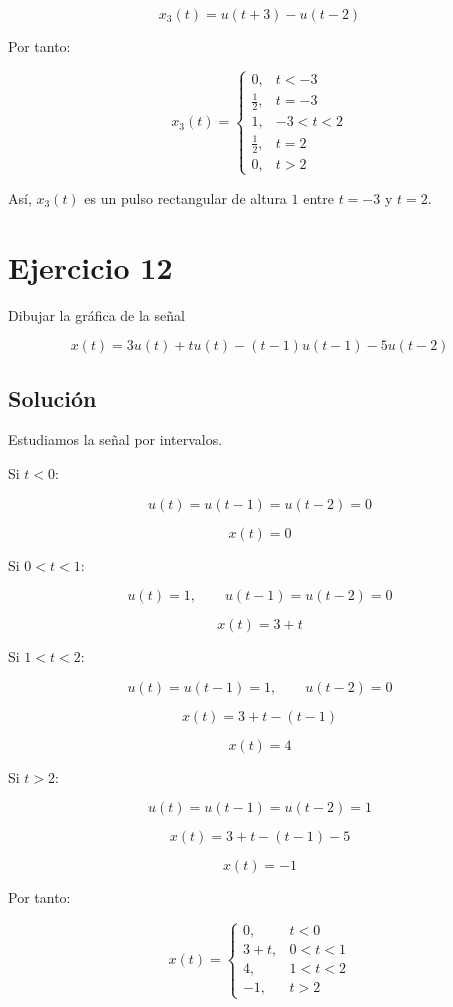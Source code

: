 \documentclass[fleqn]{article}
\begin{document}
	\[
	x_3(t)
	=
	u(t+3)-u(t-2)
	\]

	Por tanto:

	\[
	\boxed{
	x_3(t)=
	\begin{cases}
	0, & t<-3 \\[1mm]
	\frac{1}{2}, & t=-3 \\[1mm]
	1, & -3<t<2 \\[1mm]
	\frac{1}{2}, & t=2 \\[1mm]
	0, & t>2
	\end{cases}
	}
	\]

	Así, $x_3(t)$ es un pulso rectangular de altura $1$ entre $t=-3$ y $t=2$.

\section{Ejercicio 12}
	Dibujar la gráfica de la señal

	\[
	x(t)=3u(t)+tu(t)-(t-1)u(t-1)-5u(t-2)
	\]

	\subsection{Solución}

	Estudiamos la señal por intervalos.

	Si $t<0$:

	\[
	u(t)=u(t-1)=u(t-2)=0
	\]

	\[
	x(t)=0
	\]

	Si $0<t<1$:

	\[
	u(t)=1,
	\qquad
	u(t-1)=u(t-2)=0
	\]

	\[
	x(t)=3+t
	\]

	Si $1<t<2$:

	\[
	u(t)=u(t-1)=1,
	\qquad
	u(t-2)=0
	\]

	\[
	x(t)
	=
	3+t-(t-1)
	\]

	\[
	x(t)=4
	\]

	Si $t>2$:

	\[
	u(t)=u(t-1)=u(t-2)=1
	\]

	\[
	x(t)
	=
	3+t-(t-1)-5
	\]

	\[
	x(t)=-1
	\]

	Por tanto:

	\[
	\boxed{
	x(t)=
	\begin{cases}
	0, & t<0 \\[1mm]
	3+t, & 0<t<1 \\[1mm]
	4, & 1<t<2 \\[1mm]
	-1, & t>2
	\end{cases}
	}
	\]
\end{document}

